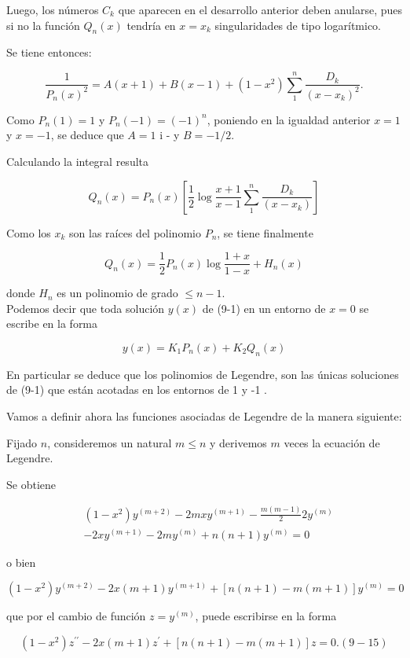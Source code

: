 \documentclass[10pt]{article}
\theoremstyle{plain}
\theoremstyle{definition}
\theoremstyle{remark}
\begin{document}
Luego, los números $C_{k}$ que aparecen en el desarrollo anterior deben anularse, pues si no la función $Q_{n}(x)$ tendría en $x=x_{k}$ singularidades de tipo logarítmico.

Se tiene entonces:

$$
\frac{1}{P_{n}(x)^{2}}=A(x+1)+B(x-1)+\left(1-x^{2}\right) \sum_{1}^{n} \frac{D_{k}}{\left(x-x_{k}\right)^{2}} .
$$

Como $P_{n}(1)=1$ y $P_{n}(-1)=(-1)^{n}$, poniendo en la igualdad anterior $x=1$ y $x=-1$, se deduce que $A=1$ i - y $B=-1 / 2$.

Calculando la integral resulta

$$
Q_{n}(x)=P_{n}(x)\left[\frac{1}{2} \log \frac{x+1}{x-1} \sum_{1}^{n} \frac{D_{k}}{\left(x-x_{k}\right)}\right]
$$

Como los $x_{k}$ son las raíces del polinomio $P_{n}$, se tiene finalmente


\begin{equation*}
Q_{n}(x)=\frac{1}{2} P_{n}(x) \log \frac{1+x}{1-x}+H_{n}(x) \tag{9-14}
\end{equation*}


donde $H_{n}$ es un polinomio de grado $\leqslant n-1$.\\
Podemos decir que toda solución $y(x)$ de (9-1) en un entorno de $x=0$ se escribe en la forma

$$
y(x)=K_{1} P_{n}(x)+K_{2} Q_{n}(x)
$$

En particular se deduce que los polinomios de Legendre, son las únicas soluciones de (9-1) que están acotadas en los entornos de 1 y -1 .

Vamos a definir ahora las funciones asociadas de Legendre de la manera siguiente:

Fijado $n$, consideremos un natural $m \leqslant n$ y derivemos $m$ veces la ecuación de Legendre.

Se obtiene

$$
\begin{aligned}
& \left(1-x^{2}\right) y^{(m+2)}-2 m x y^{(m+1)}-\frac{m(m-1)}{2} 2 y^{(m)} \\
& -2 x y^{(m+1)}-2 m y^{(m)}+n(n+1) y^{(m)}=0
\end{aligned}
$$

o bien

$$
\left(1-x^{2}\right) y^{(m+2)}-2 x(m+1) y^{(m+1)}+[n(n+1)-m(m+1)] y^{(m)}=0
$$

que por el cambio de función $z=y^{(m)}$, puede escribirse en la forma

$$
\left(1-x^{2}\right) z^{\prime \prime}-2 x(m+1) z^{\prime}+[n(n+1)-m(m+1)] z=0 .(9-15)
$$
\end{document}
